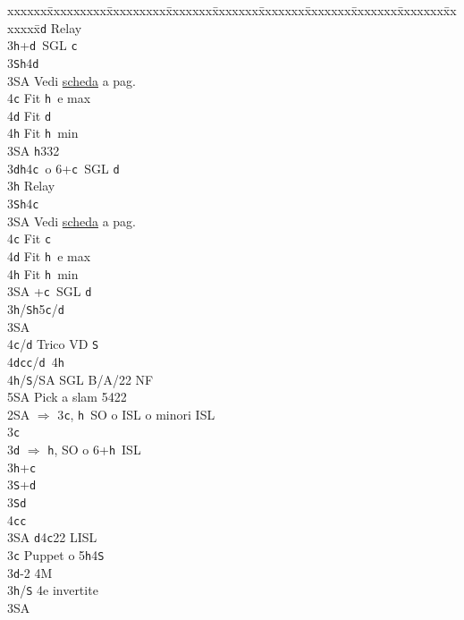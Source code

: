 \documentclass[a4paper,italian]{article}
\newcommand{\BS}{\small{\texttt{S}}}
\newcommand{\BC}{\small{\texttt{c}}}
\newcommand{\BD}{\small{\texttt{d}}}
\newcommand{\BH}{\small{\texttt{h}}}
\newenvironment{bidtable}
{\begin{tabbing}

    xxxxxx\=xxxxxxxxx\=xxxxxxxxx\=xxxxxxx\=xxxxxxx\=xxxxxxx\=xxxxxxx\=xxxxxxx\=xxxxxxx\=xxxxxxx\=\kill}
{\end{tabbing} }%
\begin{document}
\begin{multicols}{2}
\begin{bidtable}
        3\BD \> Relay\+\\
        3\BH {}+\BD\ SGL \BC \\
        3\BS {}\BH 4\BD \+\\
        3\small{SA}\> Vedi \hyperref[Riapertura3SA]{scheda} a pag. \pageref{Riapertura3SA}\\
        4\BC\> Fit \BH\ e max\\
        4\BD\> Fit \BD\\
        4\BH\> Fit \BH\ min\-\\
        3\small{SA} \BH 332\-\-\\
        3\BD {}\BH 4\BC\ o 6+\BC\ SGL \BD \+\\
        3\BH \> Relay\+\\
        3\BS {}\BH 4\BC\+\\
        3\small{SA}\> Vedi \hyperref[Riapertura3SA]{scheda} a pag. \pageref{Riapertura3SA}\\
        4\BC\> Fit \BC\\
        4\BD\> Fit \BH\ e max\\
        4\BH\> Fit \BH\ min\-\\
        3\small{SA} +\BC\ SGL \BD \-\-\\
        3\BH/\BS {}\BH 5\BC /\BD \+\\
        3\small{SA}\+\\
        4\BC/\BD \> Trico VD \BS \\
        4\BD\BC {}\BC /\BD\ 4\BH \\
        4\BH/\BS/SA\> \> SGL B/A/22 NF\\
        5\small{SA} \> Pick a slam 5422\-\-\-\-\\
        2\small{SA} \> $\Rightarrow$ 3\BC , \BH\ SO o ISL o minori ISL\+\\
        3\BC\+\\
        3\BD \> $\Rightarrow$ \BH , SO o 6+\BH\ ISL\\
        3\BH {}+\BC \+\\
        3\BS {}+\BD \-\\
        3\BS {}\BD \+\\
        4\BC {}\BC \-\\
        3\small{SA} \BD 4\BC 22 LISL\-\-\\
        3\BC \> Puppet o 5\BH 4\BS \+\\
        3\BD {}-2 4M\+\\
        3\BH/\BS \> 4e invertite\+\\
        3\small{SA}\+\\

\end{bidtable}
\end{multicols}
\end{document}
